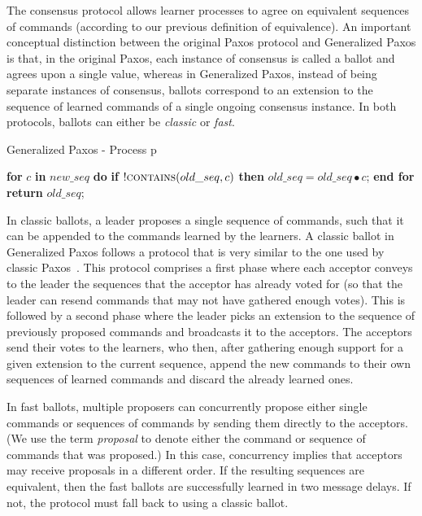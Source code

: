 The consensus protocol allows learner processes to agree on equivalent sequences of commands (according to our previous definition of equivalence).
An important conceptual distinction between the original Paxos protocol and Generalized Paxos is that, in the original Paxos, each instance of consensus is called a ballot and agrees upon a single value, whereas in Generalized Paxos, instead of being separate instances of consensus, ballots correspond to an extension to the sequence of learned commands of a single ongoing consensus instance.
In both protocols, ballots can either be \textit{classic} or \textit{fast}. \par
\begin{algorithm}
	\caption{Generalized Paxos - Process p}
	\begin{algorithmic}[1]
		
		\State \textbf{for} $c$ \textbf{in} $new\_seq$ \textbf{do} 
		\State \hspace{\algorithmicindent} \textbf{if} $!\Call{contains}{old\_seq,c}$ \textbf{then}
		\State \hspace{\algorithmicindent}\hspace{\algorithmicindent}\hspace{\algorithmicindent} $old\_seq =  old\_seq \bullet c$;
		\State \textbf{end for}
		\State \textbf{return} $old\_seq$;
		\EndFunction
	\end{algorithmic}
\end{algorithm}
In classic ballots, a leader proposes a single sequence of commands, such that it can be appended to the commands learned by the learners. 
A classic ballot in Generalized Paxos follows a protocol that is very similar to the one used by classic Paxos~\cite{Lam98}. This protocol comprises a first phase where each acceptor conveys to the leader the sequences that the acceptor has already voted for (so that the leader can resend commands that may not have gathered enough votes).
This is followed by a second phase where the leader picks an extension to the sequence of previously proposed commands and broadcasts it to the acceptors. The acceptors send their votes to the learners, who then, after gathering enough support for a given extension to the current sequence, append the new commands to their own sequences of learned commands and discard the already learned ones.\par

In fast ballots, multiple proposers can concurrently propose either single commands or sequences of commands by sending them directly to the acceptors. (We use the term \textit{proposal} to denote either the command or sequence of commands that was proposed.)
In this case, concurrency implies that acceptors may receive proposals in a different order. If the resulting sequences are equivalent, then the fast ballots are successfully learned in two message delays. If not, the protocol must fall back to using a classic ballot.

